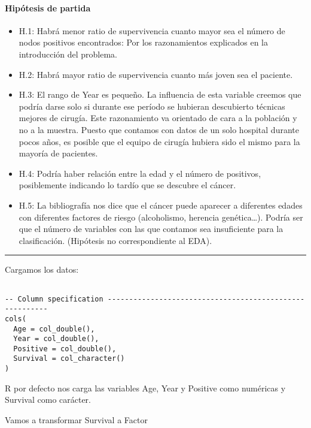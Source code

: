 \documentclass[
]{article}
\providecommand{\tightlist}{%
  \setlength{\itemsep}{0pt}\setlength{\parskip}{0pt}}
\begin{document}
\hypertarget{hipuxf3tesis-de-partida}{%
\paragraph{Hipótesis de partida}\label{hipuxf3tesis-de-partida}}

\begin{itemize}
\tightlist
\item
  H.1: Habrá menor ratio de supervivencia cuanto mayor sea el número de
  nodos positivos encontrados: Por los razonamientos explicados en la
  introducción del problema.
\item
  H.2: Habrá mayor ratio de supervivencia cuanto más joven sea el
  paciente.
\item
  H.3: El rango de Year es pequeño. La influencia de esta variable
  creemos que podría darse solo si durante ese período se hubieran
  descubierto técnicas mejores de cirugía. Este razonamiento va
  orientado de cara a la población y no a la muestra. Puesto que
  contamos con datos de un solo hospital durante pocos años, es posible
  que el equipo de cirugía hubiera sido el mismo para la mayoría de
  pacientes.
\item
  H.4: Podría haber relación entre la edad y el número de positivos,
  posiblemente indicando lo tardío que se descubre el cáncer.
\item
  H.5: La bibliografía nos dice que el cáncer puede aparecer a
  diferentes edades con diferentes factores de riesgo (alcoholismo,
  herencia genética\ldots). Podría ser que el número de variables con
  las que contamos sea insuficiente para la clasificación. (Hipótesis no
  correspondiente al EDA).
\end{itemize}

\begin{center}\rule{0.5\linewidth}{0.5pt}\end{center}

Cargamos los datos:

\begin{verbatim}

-- Column specification --------------------------------------------------------
cols(
  Age = col_double(),
  Year = col_double(),
  Positive = col_double(),
  Survival = col_character()
)
\end{verbatim}

R por defecto nos carga las variables Age, Year y Positive como
numéricas y Survival como carácter.

Vamos a transformar Survival a Factor
\end{document}
